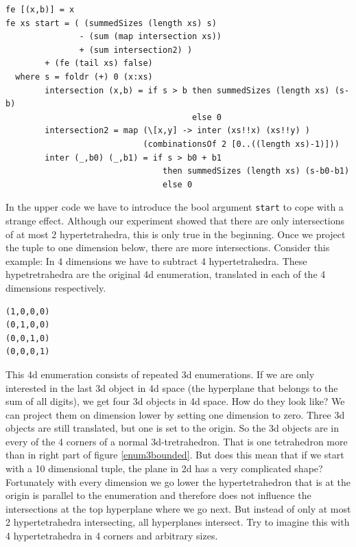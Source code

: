 \documentclass{tmr}
\begin{document}
\begin{Verbatim}
fe [(x,b)] = x
fe xs start = ( (summedSizes (length xs) s)
               - (sum (map intersection xs))
               + (sum intersection2) )
        + (fe (tail xs) false)
  where s = foldr (+) 0 (x:xs)
        intersection (x,b) = if s > b then summedSizes (length xs) (s-b)
                                      else 0
        intersection2 = map (\[x,y] -> inter (xs!!x) (xs!!y) )
                            (combinationsOf 2 [0..((length xs)-1)]))
        inter (_,b0) (_,b1) = if s > b0 + b1
                                then summedSizes (length xs) (s-b0-b1)
                                else 0
\end{Verbatim}

In the upper code we have to introduce the bool argument \verb|start| to cope with a strange effect. Although our experiment showed that there are only intersections of at most 2 hypertetrahedra, this is only true in the beginning. Once we project the tuple to one dimension below, there are more intersections.
Consider this example: In 4 dimensions we have to subtract 4 hypertetrahedra. These hypetretrahedra are the original 4d enumeration, translated in each of the 4 dimensions respectively. \eg
\begin{Verbatim}
(1,0,0,0)
(0,1,0,0)
(0,0,1,0)
(0,0,0,1)
\end{Verbatim}

This 4d enumeration consists of repeated 3d enumerations. If we are only interested in the last 3d object in 4d space (the hyperplane that belongs to the sum of all digits), we get four 3d objects in 4d space. How do they look like? We can project them on dimension lower by setting one dimension to zero. Three 3d objects are still translated, but one is set to the origin. So the 3d objects are in every of the 4 corners of a normal 3d-tretrahedron. That is one tetrahedron more than in right part of figure \ref{enum3bounded}. But does this mean that if we start with a 10 dimensional tuple, the plane in 2d has a very complicated shape? Fortunately with every dimension we go lower the hypertetrahedron that is at the origin is parallel to the enumeration and therefore does not influence the intersections at the top hyperplane where we go next. But instead of only at most 2 hypertetrahedra intersecting, all hyperplanes intersect. Try to imagine this with 4 hypertetrahedra in 4 corners and arbitrary sizes.

\end{document}
